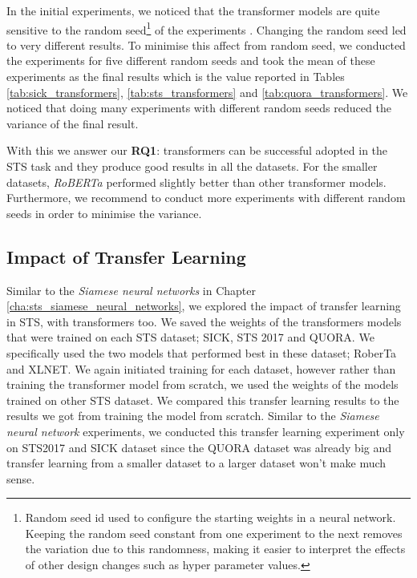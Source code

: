 In the initial experiments, we noticed that the transformer models are quite sensitive to the random seed\footnote{Random seed id used to configure the starting weights in a neural network. Keeping the random seed constant from one experiment to the next removes the variation due to this randomness, making it easier to interpret the effects of other design changes such as hyper parameter values.} of the experiments \cite{zhang2021revisiting}. Changing the random seed led to very different results. To minimise this affect from random seed, we conducted the experiments for five different random seeds and took the mean of these experiments as the final results which is the value reported in Tables \ref{tab:sick_transformers}, \ref{tab:sts_transformers} and \ref{tab:quora_transformers}. We noticed that doing many experiments with different random seeds reduced the variance of the final result. 

With this we answer our \textbf{RQ1}: transformers can be successful adopted in the STS task and they produce good results in all the datasets. For the smaller datasets, \textit{RoBERTa} performed slightly better than other transformer models. Furthermore, we recommend to conduct more experiments with different random seeds in order to minimise the variance.


\subsection{Impact of Transfer Learning}
Similar to the \textit{Siamese neural networks} in Chapter \ref{cha:sts_siamese_neural_networks}, we explored the impact of transfer learning  in STS, with transformers too. We saved the weights of the transformers models that were trained on each STS dataset; SICK, STS 2017 and QUORA. We specifically used the two models that performed best in these dataset; RoberTa and XLNET. We again initiated training for each dataset, however rather than training the transformer model from scratch, we used the weights of the models trained on other STS dataset. We compared this transfer learning results to the results we got from training the model from scratch. Similar to the \textit{Siamese neural network} experiments, we conducted this transfer learning experiment only on STS2017 and SICK dataset since the QUORA dataset was already big and transfer learning from a smaller dataset to a larger dataset won't make much sense.


